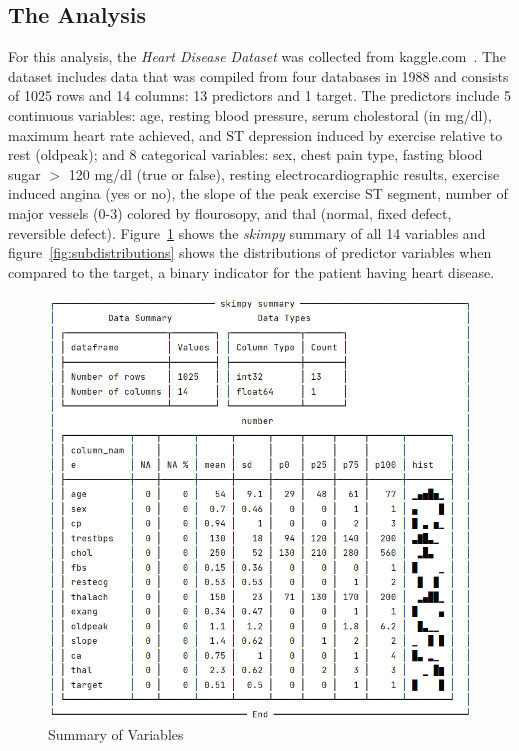 \subsection{The Analysis}\label{subsec:analysis}

For this analysis, the \emph{Heart Disease Dataset} was collected from kaggle.com~\citep{Heart-disease-dataset}.
The dataset includes data that was compiled from four databases in 1988 and consists of 1025 rows and 14 columns: 13 predictors and 1 target.
The predictors include 5 continuous variables: age, resting blood pressure, serum cholestoral (in mg/dl), maximum heart rate achieved, and ST depression induced by exercise relative to rest (oldpeak);
and 8 categorical variables: sex, chest pain type, fasting blood sugar $>$ 120 mg/dl (true or false), resting electrocardiographic results, exercise induced angina (yes or no), the slope of the peak exercise ST segment, number of major vessels (0-3) colored by flourosopy, and thal (normal, fixed defect, reversible defect).
Figure~\ref{fig:skim} shows the \emph{skimpy} summary of all 14 variables and figure~\ref{fig:subdistributions} shows the distributions of predictor variables when compared to the target, a binary indicator for the patient having heart disease.

\begin{figure}[tp]
    \centering
    \includegraphics[width=.7\textwidth]{plots/skimpy-summary.png}
     \caption[Figure]{Summary of Variables} \label{fig:skim}
\end{figure}

